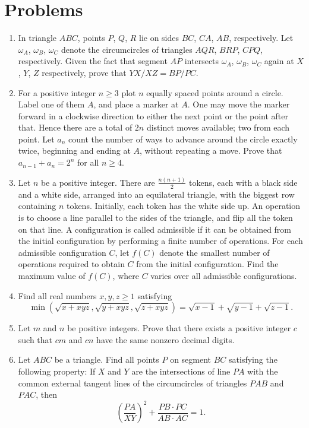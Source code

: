 \documentclass[11pt]{scrartcl}
\begin{document}
\section{Problems}
\begin{enumerate}[\bfseries 1.]
\item %
In triangle $ABC$,
points $P$, $Q$, $R$ lie on sides $BC$, $CA$, $AB$, respectively.
Let $\omega_A$, $\omega_B$, $\omega_C$ denote the
circumcircles of triangles $AQR$, $BRP$, $CPQ$, respectively.
Given the fact that segment $AP$ intersects
$\omega_A$, $\omega_B$, $\omega_C$ again at $X$, $Y$, $Z$ respectively,
prove that $YX/XZ=BP/PC$.

\item %
For a positive integer $n\geq 3$ plot $n$
equally spaced points around a circle.
Label one of them $A$, and place a marker at $A$.
One may move the marker forward in a clockwise direction
to either the next point or the point after that.
Hence there are a total of $2n$ distinct moves available;
two from each point.
Let $a_n$ count the number of ways to advance
around the circle exactly twice,
beginning and ending at $A$, without repeating a move.
Prove that $a_{n-1}+a_n=2^n$ for all $n\geq 4$.

\item %
Let $n$ be a positive integer.
There are $\tfrac{n(n+1)}{2}$ tokens,
each with a black side and a white side,
arranged into an equilateral triangle,
with the biggest row containing $n$ tokens.
Initially, each token has the white side up.
An operation is to choose a line parallel to the sides of the triangle,
and flip all the token on that line.
A configuration is called admissible if it can be obtained from the
initial configuration by performing a finite number of operations.
For each admissible configuration $C$,
let $f(C)$ denote the smallest number of operations required to
obtain $C$ from the initial configuration.
Find the maximum value of $f(C)$,
where $C$ varies over all admissible configurations.

\item %
Find all real numbers $x,y,z \ge 1$ satisfying
\[ \min \left( \sqrt{x+xyz}, \sqrt{y+xyz}, \sqrt{z+xyz} \right)
  = \sqrt{x-1} + \sqrt{y-1} + \sqrt{z-1}. \]

\item %
Let $m$ and $n$ be positive integers.
Prove that there exists a positive integer $c$
such that $cm$ and $cn$ have the same nonzero decimal digits.

\item %
Let $ABC$ be a triangle.
Find all points $P$ on segment $BC$ satisfying the following property:
If $X$ and $Y$ are the intersections of line $PA$ with the common external
tangent lines of the circumcircles of triangles $PAB$ and $PAC$, then
\[ \left( \frac{PA}{XY} \right)^2 + \frac{PB\cdot PC}{AB\cdot AC} = 1.\]

\end{enumerate}
\pagebreak
\end{document}
